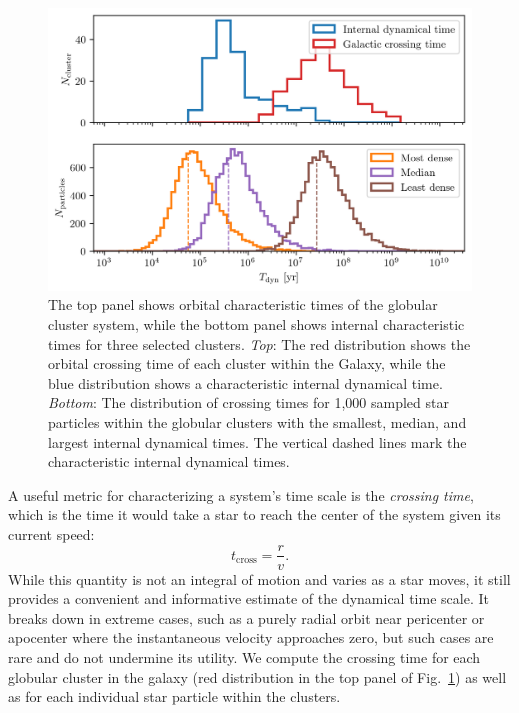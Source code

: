         \begin{figure}
            \centering
            \includegraphics[width=\linewidth]{images/GCsystemCharacteristicTimes.png}
            \caption{The top panel shows orbital characteristic times of the globular cluster system, while the bottom panel shows internal characteristic times for three selected clusters. \textit{Top}: The red distribution shows the orbital crossing time of each cluster within the Galaxy, while the blue distribution shows a characteristic internal dynamical time. \textit{Bottom}: The distribution of crossing times for 1,000 sampled star particles within the globular clusters with the smallest, median, and largest internal dynamical times. The vertical dashed lines mark the characteristic internal dynamical times.}
            \label{fig:GCsystemCharacteristicTimes}
        \end{figure}

        A useful metric for characterizing a system's time scale is the \textit{crossing time}, which is the time it would take a star to reach the center of the system given its current speed:
        \begin{equation}
            t_\mathrm{cross} = \frac{r}{v}.
        \end{equation}
        While this quantity is not an integral of motion and varies as a star moves, it still provides a convenient and informative estimate of the dynamical time scale. It breaks down in extreme cases, such as a purely radial orbit near pericenter or apocenter where the instantaneous velocity approaches zero, but such cases are rare and do not undermine its utility. We compute the crossing time for each globular cluster in the galaxy (red distribution in the top panel of Fig.~\ref{fig:GCsystemCharacteristicTimes}) as well as for each individual star particle within the clusters.



